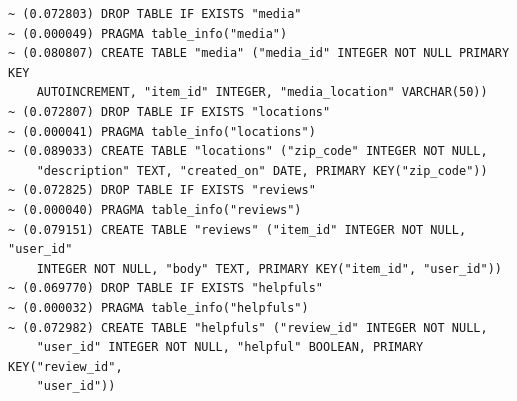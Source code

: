 \documentclass[12pt]{article}
\begin{document}
\begin{verbatim}
~ (0.072803) DROP TABLE IF EXISTS "media"
~ (0.000049) PRAGMA table_info("media")
~ (0.080807) CREATE TABLE "media" ("media_id" INTEGER NOT NULL PRIMARY KEY 
    AUTOINCREMENT, "item_id" INTEGER, "media_location" VARCHAR(50))
~ (0.072807) DROP TABLE IF EXISTS "locations"
~ (0.000041) PRAGMA table_info("locations")
~ (0.089033) CREATE TABLE "locations" ("zip_code" INTEGER NOT NULL, 
    "description" TEXT, "created_on" DATE, PRIMARY KEY("zip_code"))
~ (0.072825) DROP TABLE IF EXISTS "reviews"
~ (0.000040) PRAGMA table_info("reviews")
~ (0.079151) CREATE TABLE "reviews" ("item_id" INTEGER NOT NULL, "user_id" 
    INTEGER NOT NULL, "body" TEXT, PRIMARY KEY("item_id", "user_id"))
~ (0.069770) DROP TABLE IF EXISTS "helpfuls"
~ (0.000032) PRAGMA table_info("helpfuls")
~ (0.072982) CREATE TABLE "helpfuls" ("review_id" INTEGER NOT NULL, 
    "user_id" INTEGER NOT NULL, "helpful" BOOLEAN, PRIMARY KEY("review_id", 
    "user_id"))
\end{verbatim}
\end{document}
